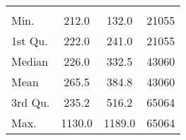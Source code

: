 \begin{tabular}{lS[table-format=5.1]S[table-format=5.1]S[table-format=5.1]}
&  &  &  \\
 Min.    & 212.0 & 132.0 & 21055 \\
 1st Qu. & 222.0 & 241.0 & 21055 \\
 Median  & 226.0 & 332.5 & 43060 \\
 Mean    & 265.5 & 384.8 & 43060 \\
 3rd Qu. & 235.2 & 516.2 & 65064 \\
 Max.    & 1130.0 & 1189.0 & 65064 \\
\end{tabular}
